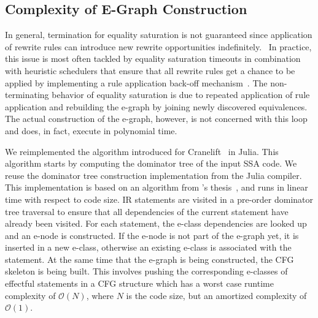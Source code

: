 
\subsection{Complexity of E-Graph Construction}
In general, termination for equality saturation is not guaranteed since application of rewrite rules can introduce new rewrite opportunities indefinitely.~\cite{willseyEggFastExtensible2021,suciuSemanticFoundationsEquality2025}
In practice, this issue is most often tackled by equality saturation timeouts in combination with heuristic schedulers that ensure that all rewrite rules get a chance to be applied by implementing a rule application back-off mechanism~\cite{cheliAutomatedCodeOptimization2021,MLSYS2021_cc427d93}.
The non-terminating behavior of equality saturation
is due to repeated application of rule application and rebuilding the e-graph by joining newly discovered equivalences.
The actual construction of the e-graph, however, is not concerned with this loop and does, in fact, execute in polynomial time.


We reimplemented the algorithm introduced for Cranelift~\cite{fallinAegraphsAcyclicEgraphs2023} in Julia.
This algorithm starts by computing the dominator tree of the input SSA code.
We reuse the dominator tree construction implementation from the Julia compiler.
This implementation is based on an algorithm from \citeauthor{georgiadisLineartimeAlgorithmsDominators2005}'s thesis~\cite{georgiadisLineartimeAlgorithmsDominators2005}, and runs in linear time with respect to code size.
IR statements are visited in a pre-order dominator tree traversal to ensure that all dependencies of the current statement have already been visited.
For each statement, the e-class dependencies are looked up and an e-node is constructed. If the e-node is not part of the e-graph yet, it is inserted in a new e-class, otherwise an existing e-class is associated with the statement.
At the same time that the e-graph is being constructed, the CFG skeleton is being built.
This involves pushing the corresponding e-classes of effectful statements in a CFG structure which has a worst case runtime complexity of $\mathcal{O}(N)$, where $N$ is the code size, but an amortized complexity of $\mathcal{O}(1)$.

